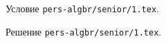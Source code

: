 \problem
Условие \texttt{pers-algbr/senior/1.tex}.

\solution Решение \texttt{pers-algbr/senior/1.tex}.
\endproblem
